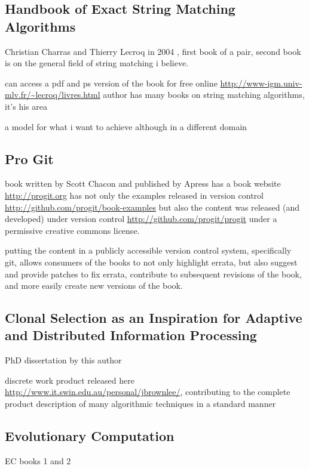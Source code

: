 \documentclass[a4paper, 11pt]{article}
\begin{document}
\subsection{Handbook of Exact String Matching Algorithms}
Christian Charras and Thierry Lecroq in 2004 \cite{Charras2004}, first book of a pair, second book is on the general field of string matching i believe.

can access a pdf and ps version of the book for free online \url{http://www-igm.univ-mlv.fr/~lecroq/livres.html}
author has many books on string matching algorithms, it's his area 

a model for what i want to achieve although in a different domain


\subsection{Pro Git}
book written by Scott Chacon and published by Apress \cite{Chacon2009}
has a book website \url{http://progit.org}
has not only the examples released in version control \url{http://github.com/progit/book-examples} but also the content was released (and developed) under version control \url{http://github.com/progit/progit} under a permissive creative commons license. 

putting the content in a publicly accessible version control system, specifically git, allows consumers of the books to not only highlight errata, but also suggest and provide patches to fix errata, contribute to subsequent revisions of the book, and more easily create new versions of the book.

\subsection{Clonal Selection as an Inspiration for Adaptive and Distributed Information Processing}

PhD dissertation by this author \cite{Brownlee2008}

discrete work product released here \url{http://www.it.swin.edu.au/personal/jbrownlee/}, contributing to the complete product 
description of many algorithmic techniques in a standard manner 

\subsection{Evolutionary Computation}

EC books 1 \cite{Baeck2000} and 2 \cite{Baeck2000a}
\end{document}

